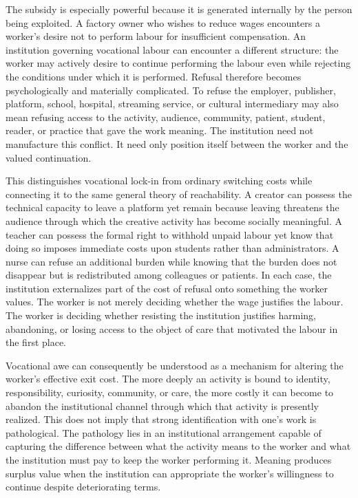 \documentclass[11pt]{article}
\begin{document}
The subsidy is especially powerful because it is generated internally by the person being exploited. A factory owner who wishes to reduce wages encounters a worker's desire not to perform labour for insufficient compensation. An institution governing vocational labour can encounter a different structure: the worker may actively desire to continue performing the labour even while rejecting the conditions under which it is performed. Refusal therefore becomes psychologically and materially complicated. To refuse the employer, publisher, platform, school, hospital, streaming service, or cultural intermediary may also mean refusing access to the activity, audience, community, patient, student, reader, or practice that gave the work meaning. The institution need not manufacture this conflict. It need only position itself between the worker and the valued continuation.

This distinguishes vocational lock-in from ordinary switching costs while connecting it to the same general theory of reachability. A creator can possess the technical capacity to leave a platform yet remain because leaving threatens the audience through which the creative activity has become socially meaningful. A teacher can possess the formal right to withhold unpaid labour yet know that doing so imposes immediate costs upon students rather than administrators. A nurse can refuse an additional burden while knowing that the burden does not disappear but is redistributed among colleagues or patients. In each case, the institution externalizes part of the cost of refusal onto something the worker values. The worker is not merely deciding whether the wage justifies the labour. The worker is deciding whether resisting the institution justifies harming, abandoning, or losing access to the object of care that motivated the labour in the first place.

Vocational awe can consequently be understood as a mechanism for altering the worker's effective exit cost. The more deeply an activity is bound to identity, responsibility, curiosity, community, or care, the more costly it can become to abandon the institutional channel through which that activity is presently realized. This does not imply that strong identification with one's work is pathological. The pathology lies in an institutional arrangement capable of capturing the difference between what the activity means to the worker and what the institution must pay to keep the worker performing it. Meaning produces surplus value when the institution can appropriate the worker's willingness to continue despite deteriorating terms.
\end{document}

